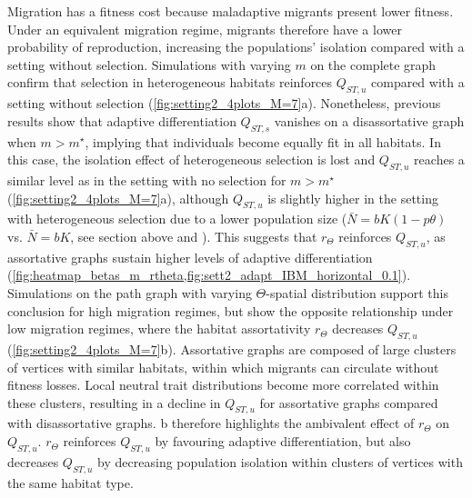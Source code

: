   Migration has a fitness cost because maladaptive migrants present lower fitness. Under an equivalent migration regime, migrants therefore have a lower probability of reproduction, increasing the populations' isolation compared with a setting without selection.
  Simulations with varying $m$ on the complete graph confirm that selection in heterogeneous habitats reinforces $Q_{ST,u}$ compared with a setting without selection (\cref{fig:setting2_4plots_M=7}a). 
  Nonetheless, previous results show that adaptive differentiation $Q_{ST,s}$ vanishes on a disassortative graph when $m > m^\star$, implying that individuals become equally fit in all habitats. 
  In this case, the isolation effect of heterogeneous selection is lost and $Q_{ST,u}$ reaches a similar level as in the setting with no selection for $m > m^\star$ (\cref{fig:setting2_4plots_M=7}a), although $Q_{ST,u}$ is slightly higher in the setting with heterogeneous selection due to a lower population size ($\bar{N}=bK(1-p \theta)$ vs. $\bar{N}=bK$, see section above and ). %
  This suggests that $r_\Theta$ reinforces $Q_{ST,u}$, as assortative graphs sustain higher levels of adaptive differentiation (\cref{fig:heatmap_betas_m_rtheta,fig:sett2_adapt_IBM_horizontal_0.1}). 
  Simulations on the path graph with varying $\Theta$-spatial distribution support this conclusion for high migration regimes, but show the opposite relationship under low migration regimes, where the habitat assortativity $r_\Theta$ decreases $Q_{ST,u}$ (\cref{fig:setting2_4plots_M=7}b).
  Assortative graphs are composed of large clusters of vertices with similar habitats, within which migrants can circulate without fitness losses. Local neutral trait distributions become more correlated within these clusters, resulting in a decline in $Q_{ST,u}$ for assortative graphs compared with disassortative graphs.  %
  b therefore highlights the ambivalent effect of $r_\Theta$ on $Q_{ST,u}$. $r_\Theta$ reinforces $Q_{ST,u}$ by favouring adaptive differentiation, but also decreases $Q_{ST,u}$ by decreasing population isolation within clusters of vertices with the same habitat type. 
  
